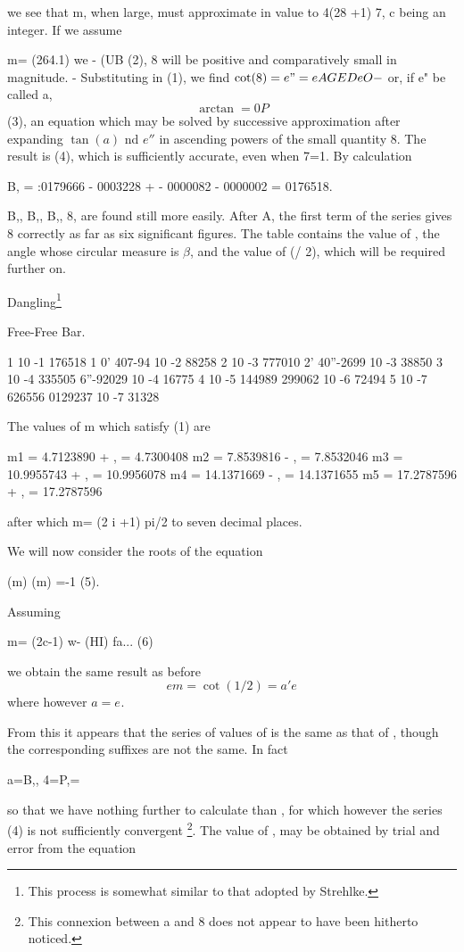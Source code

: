 we see that m, when large, must approximate in value to 4(28 +1) 7, c
being an integer. If we assume

m= (264.1) we - (UB (2), 8 will be positive and comparatively small in
magnitude. - Substituting in (1), we find
\( \cot(8)=e"=e AGE De O-\)
or, if e" be called a,
\[ \arctan = 0P\]
(3), an equation which may be solved by successive approximation after
expanding \(\tan(a)\)  nd \(e''\) in ascending powers of the small quantity 8.
The result is
(4),
which is sufficiently accurate, even when 7=1. By calculation

B, = :0179666 - 0003228 + - 0000082 - 0000002 = 0176518.

B,, B,, B,, 8, are found still more easily. After A, the first term of
the series gives 8 correctly as far as six significant figures. The
table contains the value of , the angle whose circular measure is \(\beta\),
and the value of (/ 2), which will be required further on.

Dangling\footnote{ This process is somewhat similar to that adopted by Strehlke.}

Free-Free Bar.

1 10 -1 176518 1 0' 407-94 10 -2 88258 2 10 -3 777010 2' 40''-2699 10 -3
38850 3 10 -4 335505 6''-92029 10 -4 16775 4 10 -5 144989 299062 10 -6
72494 5 10 -7 626556 0129237 10 -7 31328

The values of m which satisfy (1) are

m1 = 4.7123890 + , = 4.7300408 m2 = 7.8539816 - , = 7.8532046 m3 =
10.9955743 + , = 10.9956078 m4 = 14.1371669 - , = 14.1371655 m5 =
17.2787596 + , = 17.2787596

after which m= (2 i +1) pi/2 to seven decimal places.

We will now consider the roots of the equation

(m) (m) =-1 (5).

Assuming

m= (2c-1) w- (HI) fa... (6)

we obtain the same result as before
\[ e m = \cot(1/2) = a' e^{} \]
where however \( a = e^{}\).

From this it appears that the series of values of is the same as that of
, though the corresponding suffixes are not the same. In fact

a=B,, 4=P,=

so that we have nothing further to calculate than , for which however
the series (4) is not sufficiently convergent
\footnote{This connexion between a and 8 does not appear to have been hitherto noticed.}.
The value of , may be obtained by trial and error from the equation

